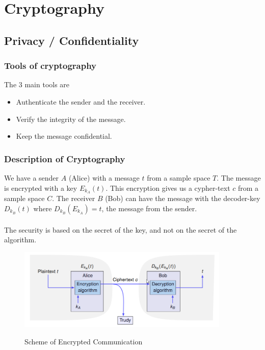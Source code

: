 \documentclass{article}
\begin{document}
\section{Cryptography}
\subsection{Privacy / Confidentiality}
\subsubsection{Tools of cryptography} The 3 main tools are 
\begin{itemize}
\item Authenticate the sender and the receiver.
\item Verify the integrity of the message.
\item Keep the message confidential.
\end{itemize}

\subsubsection{Description of Cryptography} We have a sender $ A $ (Alice) with a message $ t $ from a sample space $ T $. The message is encrypted with a key $ E_{k_{A}}(t) $. This encryption gives us a cypher-text $ c $ from a sample space $ C $. The receiver $ B $ (Bob) can have the message with the decoder-key $ D_{k_{B}}(t) $ where $ D_{k_{B}}(E_{k_{A}}) = t $, the message from the sender.
\\
\\
The security is based on the secret of the key, and not on the secret of the algorithm.

\begin{figure}[h]
  \hfill\includegraphics[width=0.9\textwidth]{crypto.png}\hspace*{\fill}
  \label{fig:crypto}
  
  \caption{Scheme of Encrypted Communication}
\end{figure}
\end{document}
